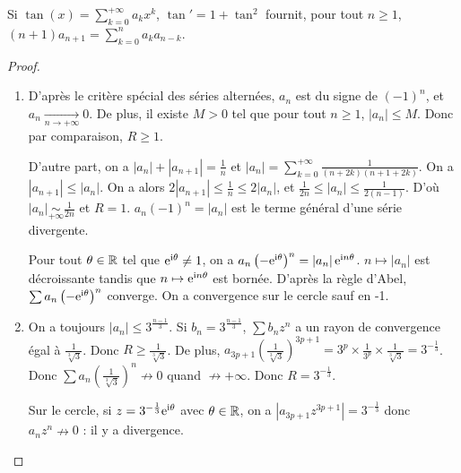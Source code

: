 \documentclass[12pt]{article}
\begin{document}
\begin{remark}
    Si $\tan(x)=\sum_{k=0}^{+\infty}a_k x^{k}$, $\tan'=1+\tan^{2}$ fournit, pour tout $n\geqslant1$, $(n+1)a_{n+1}=\sum_{k=0}^{n}a_{k}a_{n-k}$.
\end{remark}

\begin{proof}
    \phantom{}
    \begin{enumerate}
        \item D'après le critère spécial des séries alternées, $a_n$ est du signe de $(-1)^{n}$, et $a_n\xrightarrow[n\to+\infty]{}0$. De plus, il existe $M>0$ tel que pour tout $n\geqslant1$, $\left\lvert a_n\right\rvert\leqslant M$. Donc par comparaison, $R\geqslant1$.
        
        D'autre part, on a $\left\lvert a_n\right\rvert+\left\lvert a_{n+1}\right\rvert=\frac{1}{n}$ et $\left\lvert a_n\right\rvert=\sum_{k=0}^{+\infty}\frac{1}{(n+2k)(n+1+2k)}$. On a $\left\lvert a_{n+1}\right\rvert\leqslant\left\lvert a_n\right\rvert$. On a alors $2\left\lvert a_{n+1}\right\rvert\leqslant\frac{1}{n}\leqslant2\left\lvert a_n\right\rvert$, et $\frac{1}{2n}\leqslant\left\lvert a_n\right\rvert\leqslant\frac{1}{2(n-1)}$. D'où $\left\lvert a_n\right\rvert\underset{+\infty}{\sim}\frac{1}{2n}$ et $R=1$. $a_n(-1)^{n}=\left\lvert a_n\right\rvert$ est le terme général d'une série divergente.

        Pour tout $\theta\in\mathbb{R}$ tel que $\mathrm{e}^{\mathrm{i}\theta}\neq1$, on a $a_n\left(-\mathrm{e}^{\mathrm{i}\theta}\right)^{n}=\left\lvert a_n\right\rvert\mathrm{e}^{\mathrm{i} n\theta}$. $n\mapsto\left\lvert a_n\right\rvert$ est décroissante tandis que $n\mapsto\mathrm{e}^{\mathrm{i} n\theta}$ est bornée. D'après la règle d'Abel, $\sum a_{n}\left(-\mathrm{e}^{\mathrm{i}\theta}\right)^{n}$ converge. On a convergence sur le cercle sauf en -1.

        \item On a toujours $\left\lvert a_n\right\rvert\leqslant3^{\frac{n-1}{3}}$. Si $b_n=3^{\frac{n-1}{3}}$, $\sum b_nz^{n}$ a un rayon de convergence égal à $\frac{1}{\sqrt[3]{3}}$. Donc $R\geqslant\frac{1}{\sqrt[3]{3}}$. De plus, $a_{3p+1}\left(\frac{1}{\sqrt[3]{3}}\right)^{3p+1}=3^{p}\times\frac{1}{3^{p}}\times\frac{1}{\sqrt[3]{3}}=3^{-\frac{1}{3}}$. Donc $\sum a_n\left(\frac{1}{\sqrt[3]{3}}\right)^{n}\not\to0$ quand $\nrightarrow+\infty$. Donc $R=3^{-\frac{1}{3}}$.
        
        Sur le cercle, si $z=3^{-\frac{1}{3}}\mathrm{e}^{\mathrm{i}\theta}$ avec $\theta\in\mathbb{R}$, on a $\left\lvert a_{3p+1}z^{3p+1}\right\rvert=3^{-\frac{1}{3}}$ donc $a_{n}z^{n}\nrightarrow0$ : il y a divergence.


\end{enumerate}
\end{proof}
\end{document}

